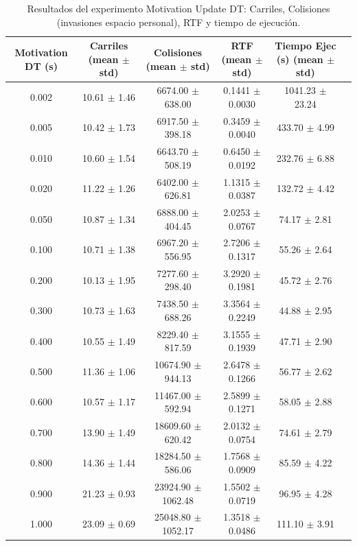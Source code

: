 \begin{table}[htbp]
\centering
\caption{Resultados del experimento Motivation Update DT: Carriles, Colisiones (invasiones espacio personal), RTF y tiempo de ejecución.}
\label{tab:motivation_update_dt}
\begin{tabular}{cccccc}
\hline
Motivation DT (s) & Carriles (mean $\pm$ std) & Colisiones (mean $\pm$ std) & RTF (mean $\pm$ std) & Tiempo Ejec (s) (mean $\pm$ std) \\
\hline
0.002 & 10.61 $\pm$ 1.46 & 6674.00 $\pm$ 638.00 & 0.1441 $\pm$ 0.0030 & 1041.23 $\pm$ 23.24 \\
0.005 & 10.42 $\pm$ 1.73 & 6917.50 $\pm$ 398.18 & 0.3459 $\pm$ 0.0040 & 433.70 $\pm$ 4.99 \\
0.010 & 10.60 $\pm$ 1.54 & 6643.70 $\pm$ 508.19 & 0.6450 $\pm$ 0.0192 & 232.76 $\pm$ 6.88 \\
0.020 & 11.22 $\pm$ 1.26 & 6402.00 $\pm$ 626.81 & 1.1315 $\pm$ 0.0387 & 132.72 $\pm$ 4.42 \\
0.050 & 10.87 $\pm$ 1.34 & 6888.00 $\pm$ 404.45 & 2.0253 $\pm$ 0.0767 & 74.17 $\pm$ 2.81 \\
0.100 & 10.71 $\pm$ 1.38 & 6967.20 $\pm$ 556.95 & 2.7206 $\pm$ 0.1317 & 55.26 $\pm$ 2.64 \\
0.200 & 10.13 $\pm$ 1.95 & 7277.60 $\pm$ 298.40 & 3.2920 $\pm$ 0.1981 & 45.72 $\pm$ 2.76 \\
0.300 & 10.73 $\pm$ 1.63 & 7438.50 $\pm$ 688.26 & 3.3564 $\pm$ 0.2249 & 44.88 $\pm$ 2.95 \\
0.400 & 10.55 $\pm$ 1.49 & 8229.40 $\pm$ 817.59 & 3.1555 $\pm$ 0.1939 & 47.71 $\pm$ 2.90 \\
0.500 & 11.36 $\pm$ 1.06 & 10674.90 $\pm$ 944.13 & 2.6478 $\pm$ 0.1266 & 56.77 $\pm$ 2.62 \\
0.600 & 10.57 $\pm$ 1.17 & 11467.00 $\pm$ 592.94 & 2.5899 $\pm$ 0.1271 & 58.05 $\pm$ 2.88 \\
0.700 & 13.90 $\pm$ 1.49 & 18609.60 $\pm$ 620.42 & 2.0132 $\pm$ 0.0754 & 74.61 $\pm$ 2.79 \\
0.800 & 14.36 $\pm$ 1.44 & 18284.50 $\pm$ 586.06 & 1.7568 $\pm$ 0.0909 & 85.59 $\pm$ 4.22 \\
0.900 & 21.23 $\pm$ 0.93 & 23924.90 $\pm$ 1062.48 & 1.5502 $\pm$ 0.0719 & 96.95 $\pm$ 4.28 \\
1.000 & 23.09 $\pm$ 0.69 & 25048.80 $\pm$ 1052.17 & 1.3518 $\pm$ 0.0486 & 111.10 $\pm$ 3.91 \\
\hline
\end{tabular}
\end{table}
